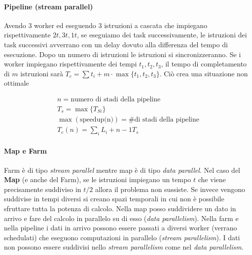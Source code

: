 

\paragraph{Pipeline (stream parallel)}


Avendo 3 worker ed eseguendo 3 istruzioni a cascata che impiegano
rispettivamente $ 2t, 3t, 1t $, se eseguiamo dei task successivamente, le
istruzioni dei task successivi avverrano con un delay dovuto alla differenza del
tempo di esecuzione. Dopo un numero di istruzioni le istruzioni si
sincronizzeranno. Se i worker impiegano rispettivamente dei tempi $ t_1,t_2,t_3
$, il tempo di completamento di $ m $ istruzioni sarà $ T_c = \sum t_i + m \cdot
\max\{t_1,t_2,t_3\} $. Ciò crea una situazione non ottimale

\[ \begin{aligned}
n = \text{numero di stadi della pipeline} \\
T_s = \max\{T_{Si}\} \\
\max(\text{speedup(n)}) = \text{\# di stadi della pipeline} \\
T_c (n) = \sum_i L_i + n-1 T_s \end{aligned} \]


\paragraph{Map e Farm}

Farm è di tipo \textit{stream parallel} mentre map è di tipo \textit{data
parallel}. Nel caso del \textbf{Map} (e anche del Farm), se le  istruzioni
impiegano un tempo $ t $ che viene precisamente suddiviso in $ t/2 $ allora il
problema non sussiste. Se invece vengono suddivise in tempi diversi si creano
spazi temporali in cui non è possibile sfruttare tutta la potenza di calcolo.
Nella map posso suddividere un dato in arrivo e fare del calcolo in parallelo su
di esso (\textit{data parallelism}). Nella farm e nella pipeline i dati in
arrivo possono essere passati a diversi worker (verrano schedulati) che eseguono
computazioni in parallelo (\textit{stream parallelism}). I dati non possono
essere suddivisi nello \textit{stream parallelism} come nel \textit{data
parallelism}.

